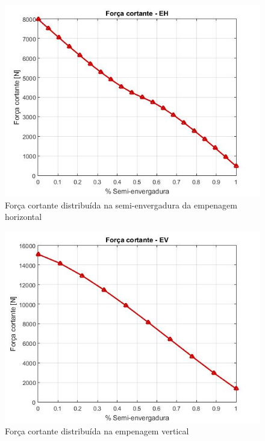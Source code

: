 \begin{figure}
\centering
\includegraphics[width=\textwidth]{cargas/imagens/cort_EH.jpg}
\caption{Força cortante distribuída na semi-envergadura da empenagem horizontal}
\label{fig:cort_EH}
\end{figure}

\begin{figure}
\centering
\includegraphics[width=\textwidth]{cargas/imagens/cort_EV.jpg}
\caption{Força cortante distribuída na empenagem vertical}
\label{fig:cort_EV}
\end{figure}

